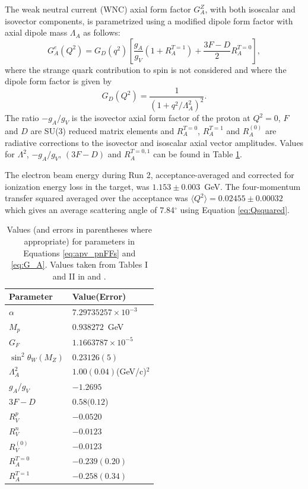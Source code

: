 The weak neutral current (WNC) axial form factor $G_A^Z$, with both isoscalar and isovector components, is parametrized using a modified dipole form factor with axial dipole mass $\Lambda_A$ as follows\cite{Lui2007}:
\begin{equation}
G_A^e(Q^2)=G_D(q^2)\left[\frac{g_A}{g_V}(1+R_A^{T=1})+\frac{3F-D}{2}R_A^{T=0}\right],
\label{eq:G_A}
\end{equation}
 where the strange quark contribution to spin is not considered and where the dipole form factor is given by
\[
G_D(Q^2)=\frac{1}{(1+q^2/\Lambda_A^2)^2}.
\]
The ratio $-g_A/g_V$ is the isovector axial form factor of the proton at $Q^2=0$, $F$ and $D$ are SU(3) reduced matrix elements\cite{Filippone} and $R_A^{T=0}$, $R_A^{T=1}$ and $R_A^{(0)}$ are radiative corrections to the isovector and isoscalar axial vector amplitudes. Values for $\Lambda^2$, $-g_A/g_V$, $(3F-D)$ and $R_A^{T=0,1}$ can be found in Table \ref{tab:Apv_parameters}. 

The electron beam energy during Run 2, acceptance-averaged and corrected for ionization energy loss in the target, was $1.153\pm0.003$~GeV. The four-momentum transfer squared averaged over the acceptance was $\langle Q^2\rangle=0.02455\pm0.00032$ which gives an average scattering angle of 7.84$^{\circ}$ using Equation \ref{eq:Qsquared}.

\begin{table}
\caption{\label{tab:Apv_parameters}Values (and errors in parentheses where appropriate) for parameters in Equations \ref{eq:apv_pnFFs} and \ref{eq:G_A}. Values taken from Tables I and II in \cite{Lui2007} and \cite{PDG2014}.}
\begin{center}
\begin{tabular}{l|l}\hline
Parameter&Value(Error)\\\hline\hline
$\alpha$&$7.29735257\times10^{-3}$\\
$M_p$&$0.938272$~GeV\\
$G_F$&$1.1663787\times10^{-5}$\\
$\sin^2\theta_W(M_Z)$&$0.23126(5)$\\
$\Lambda_A^2$&$1.00(0.04)$(GeV/c)$^2$\\
$g_A/g_V$&$-1.2695$\\
$3F-D$&$0.58(0.12$)\\
$R_V^p$&$-0.0520$\\
$R_V^n$&$-0.0123$\\
$R_V^{(0)}$&$-0.0123$\\
$R_A^{T=0}$&$-0.239(0.20)$\\
$R_A^{T=1}$&$-0.258(0.34)$\\\hline
\end{tabular}
\end{center}
\end{table}

